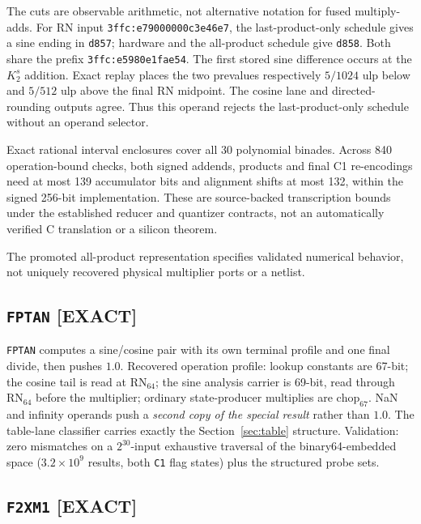 \documentclass[11pt]{article}
\newcommand{\chop}[1]{\mathrm{chop}_{#1}}   %
\newcommand{\rn}[1]{\mathrm{RN}_{#1}}       %
\newcommand{\instr}[1]{\texttt{#1}}
\begin{document}
The cuts are observable arithmetic, not alternative notation for fused
multiply-adds. For RN input \texttt{3ffc:e79000000c3e46e7}, the last-product-only
schedule gives a sine ending in \texttt{d857}; hardware and the all-product
schedule give \texttt{d858}. Both share the prefix \texttt{3ffc:e5980e1fae54}.
The first stored
sine difference occurs at the $K_2^s$ addition. Exact replay places the two
prevalues respectively $5/1024$ ulp below and $5/512$ ulp above the final RN
midpoint. The cosine lane and directed-rounding outputs agree. Thus this
operand rejects the last-product-only schedule without an operand selector.

Exact rational interval enclosures cover all 30 polynomial binades. Across
840 operation-bound checks, both signed addends, products and final C1
re-encodings need at most 139 accumulator bits and alignment shifts at most
132, within the signed 256-bit implementation. These are source-backed
transcription bounds under the established reducer and quantizer contracts,
not an automatically verified C translation or a silicon theorem.

The promoted all-product representation specifies validated numerical
behavior, not uniquely recovered physical multiplier ports or a netlist.

\subsection{\instr{FPTAN} \textnormal{[EXACT]}}

\instr{FPTAN} computes a sine/cosine pair with its own terminal profile and
one final divide, then pushes $1.0$. Recovered operation profile: lookup
constants are 67-bit; the cosine tail is read at $\rn{64}$; the sine
analysis carrier is 69-bit, read through $\rn{64}$ before the
multiplier; ordinary state-producer multiplies are $\chop{67}$.
NaN and infinity operands push a \emph{second copy of the special
result} rather than $1.0$.  The table-lane classifier carries exactly
the Section~\ref{sec:table} structure.  Validation: zero mismatches
on a $2^{30}$-input exhaustive traversal of the binary64-embedded
space ($3.2\times10^{9}$ results, both \texttt{C1} flag states) plus
the structured probe sets.

\subsection{\instr{F2XM1} \textnormal{[EXACT]}}
\end{document}
